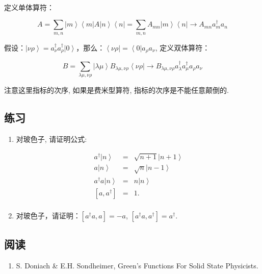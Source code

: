 定义单体算符：

\begin{equation}\label{one body operator}
A = \sum\limits_{m,n} {\left| m \right\rangle \left\langle m
\right|A\left| n \right\rangle \left\langle n \right|}  =
\sum\limits_{m,n} {A_{mn} \left| m \right\rangle \left\langle n
\right|}  \to A_{mn} a_m^\dag  a_n
\end{equation}

假设：$\left| {\nu \rho } \right\rangle  = a_\nu ^\dag  a_\rho ^\dag
\left| 0 \right\rangle $，那么：$\left\langle {\nu \rho } \right| =
\left\langle 0 \right|a_\rho  a_\nu $, 定义双体算符：

\begin{equation}\label{two body operator}
B = \sum\limits_{\lambda \mu ,\nu \rho } {\left| {\lambda \mu }
\right\rangle B_{\lambda \mu ,\nu \rho } \left\langle {\nu \rho }
\right|}  \to B_{\lambda \mu ,\nu \rho } a_\lambda ^\dag a_\mu ^\dag
a_\rho  a_\nu
\end{equation}

注意这里指标的次序, 如果是费米型算符, 指标的次序是不能任意颠倒的.

\subsection*{练习}

\begin{enumerate}

\item 

对玻色子, 请证明公式: 

\begin{eqnarray*}
a^\dagger \left| n \right\rangle & = & \sqrt{n+1} \left| n+1  \right\rangle  \\
a \left| n \right\rangle & = & \sqrt{n} \left| n-1 \right\rangle  \\
a^\dagger a \left| n \right\rangle & = & n \left| n \right\rangle \\
\left[ a, a^{\dagger} \right]  & = & 1 .\\
\end{eqnarray*}

\item 对玻色子，请证明：$[a^{\dag}a, a]=-a$, $[a^{\dag}a, a^{\dag}]=a^{\dag}$.

\end{enumerate}

\subsection*{阅读}

\begin{enumerate}
\item 

S. Doniach \& E.H. Sondheimer, Green's Functions For Solid State Physicists.


\end{enumerate}